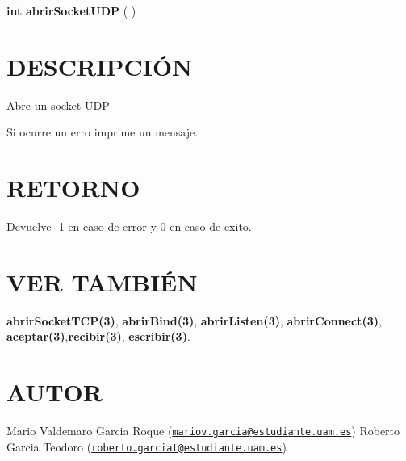 {\bfseries int} {\bfseries abrir\-Socket\-U\-D\-P} {\bfseries }( )\hypertarget{getTamanoFichero_descripcion}{}\section{D\-E\-S\-C\-R\-I\-P\-C\-IÓ\-N}\label{getTamanoFichero_descripcion}
Abre un socket U\-D\-P

Si ocurre un erro imprime un mensaje.\hypertarget{getTamanoFichero_retorno}{}\section{R\-E\-T\-O\-R\-N\-O}\label{getTamanoFichero_retorno}
Devuelve -\/1 en caso de error y 0 en caso de exito.\hypertarget{servidorArchivo_seealso}{}\section{V\-E\-R T\-A\-M\-B\-IÉ\-N}\label{servidorArchivo_seealso}
{\bfseries abrir\-Socket\-T\-C\-P(3)}, {\bfseries abrir\-Bind(3)}, {\bfseries abrir\-Listen(3)}, {\bfseries abrir\-Connect(3)}, {\bfseries aceptar(3)},{\bfseries recibir(3)}, {\bfseries escribir(3)}.\hypertarget{getTamanoFichero_authors}{}\section{A\-U\-T\-O\-R}\label{getTamanoFichero_authors}
Mario Valdemaro Garcia Roque (\href{mailto:mariov.garcia@estudiante.uam.es}{\tt mariov.\-garcia@estudiante.\-uam.\-es}) Roberto Garcia Teodoro (\href{mailto:roberto.garciat@estudiante.uam.es}{\tt roberto.\-garciat@estudiante.\-uam.\-es}) 